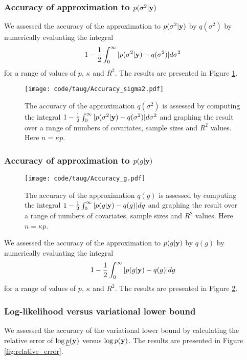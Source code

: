 \documentclass{amsart}[12pt]
\begin{document}
\subsubsection{Accuracy of approximation to $p(\sigma^2 | {\bf y})$}

We assessed the accuracy of the approximation to $p(\sigma^2 | {\bf y})$ by $q(\sigma^2)$ by numerically evaluating
the integral
\[
	1 - \frac{1}{2} \int_0^\infty |p(\sigma^2 | {\bf y}) - q(\sigma^2)| d \sigma^2
\]
for a range of values of $p$, $\kappa$ and $R^2$. The results are presented in Figure \ref{fig:accuracy_sigma2}.

\begin{figure}[p]
	\texttt{[image: code/taug/Accuracy\_sigma2.pdf]}
	\caption{The accuracy of the approximation $q(\sigma^2)$ is assessed by computing the integral   $1 -
		\frac{1}{2} \int_0^\infty |p(\sigma^2 | {\bf y}) - q(\sigma^2)| d \sigma^2$ and graphing the result over a range
		of numbers of covariates, sample sizes and $R^2$  values. Here $n = \kappa p$.}
	\label{fig:accuracy_sigma2}
\end{figure}

\subsubsection{Accuracy of approximation to $p(g | {\bf y})$}

\begin{figure}[p]
	\texttt{[image: code/taug/Accuracy\_g.pdf]}
	\caption{The accuracy of the approximation $q(g)$ is assessed by computing the integral   $1 -
		\frac{1}{2} \int_0^\infty |p(g | {\bf y}) - q(g)| d g$ and graphing the result over a range
		of numbers of covariates, sample sizes and $R^2$  values. Here $n = \kappa p$.}
	\label{fig:accuracy_g}
\end{figure}

We assessed the accuracy of the approximation to $p(g | {\bf y})$ by $q(g)$ by numerically evaluating the integral
\[
	1 - \frac{1}{2} \int_0^\infty |p(g | {\bf y}) - q(g)| d g
\]
for a range of values of $p$, $\kappa$ and $R^2$. The results are presented in Figure \ref{fig:accuracy_g}.


\subsubsection{Log-likelihood versus variational lower bound}

We assessed the accuracy of the variational lower bound by calculating the relative error of
$\log{\underline{p}({\bf y})}$ versus $\log{p({\bf y})}$. The results are presented in Figure
\ref{fig:relative_error}.
\end{document}
